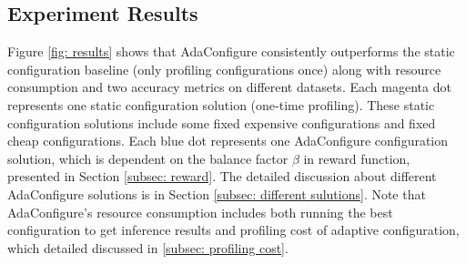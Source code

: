 \begin{table}[!t]
	\centering
	\caption{Experiment parameters}
	\label{tab: parameters}
\end{table}

\subsection{Experiment Results}
Figure \ref{fig: results} shows that AdaConfigure consistently outperforms the static configuration baseline (only profiling configurations once) along with resource consumption and two accuracy metrics on different datasets. Each magenta dot represents one static configuration solution (one-time profiling).
These static configuration solutions include some fixed expensive configurations and fixed cheap configurations. 
Each blue dot represents one AdaConfigure configuration solution, which is dependent on the balance factor $\beta$ in reward function, presented in Section \ref{subsec: reward}. The detailed discussion about different AdaConfigure solutions is in Section \ref{subsec: different sulutions}. Note that AdaConfigure's resource consumption includes both running the best configuration to get inference results and profiling cost of adaptive configuration, which detailed discussed in \ref{subsec: profiling cost}. 

